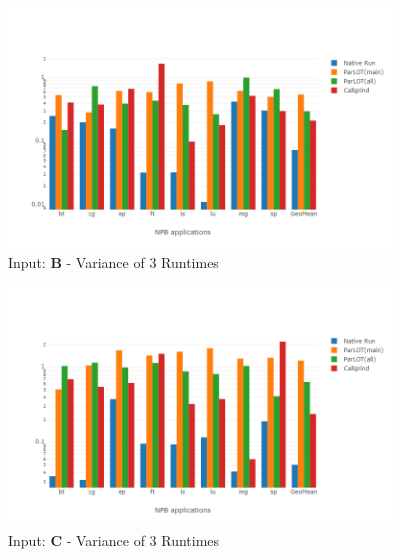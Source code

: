 \begin{figure}[!t]
\centering
\includegraphics[width=4in]{figs.comet/comet_chartAvg_var_B_p3_5.png}
\caption{ Input: \textbf{B}  - Variance of 3 Runtimes
}
\label{comet_chartAvg_var_B_p3_5}
\end{figure}


\begin{figure}[!t]
\centering
\includegraphics[width=4in]{figs.comet/comet_chartAvg_var_C_p3_5.png}
\caption{ Input: \textbf{C}  - Variance of 3 Runtimes
}
\label{comet_chartAvg_var_C_p3_5}
\end{figure}
